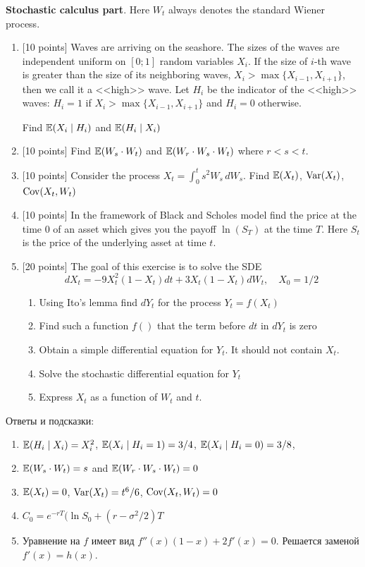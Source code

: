 \documentclass[pdftex,12pt,a4paper]{article}
\begin{document}
\vspace{20pt}

\textbf{Stochastic calculus part}. Here $W_t$ always denotes the standard Wiener process. 

\vspace{20pt}

\begin{enumerate}[resume]
\item $[$10 points] Waves are arriving on the seashore. The sizes of the waves are independent uniform on $[0;1]$ random variables $X_i$. If the size of $i$-th wave is greater than the size of its neighboring waves, $X_i>\max\{X_{i-1},X_{i+1}\}$, then we call it a <<high>> wave. Let $H_i$ be the indicator of the <<high>> waves: $H_i=1$ if $X_i>\max\{X_{i-1},X_{i+1}\}$ and $H_i=0$ otherwise.

Find $\mathbb{E}(X_i \mid H_i)$ and $\mathbb{E}(H_i \mid X_i)$ 
\item $[$10 points] Find $\mathbb{E}(W_s \cdot W_t)$ and $\mathbb{E}(W_r \cdot W_s \cdot W_t)$ where $r<s<t$.
\item $[$10 points] Consider the process $X_t=\int_0^t s^2 W_s\,dW_s$. Find $\mathbb{E}(X_t)$, $\operatorname{Var}(X_t)$, $\operatorname{Cov}(X_t,W_t)$
\item $[$10 points] In the framework of Black and Scholes model find the price at the time $0$ of an asset which gives you the payoff $\ln(S_T)$ at the time $T$. Here $S_t$ is the price of the underlying asset at time $t$.

\item $[$20 points] The goal of this exercise is to solve the SDE
\[
dX_t=-9X_t^2(1-X_t)dt+3X_t(1-X_t)dW_t,\quad X_0=1/2
\]
\begin{enumerate}
\item Using Ito's lemma find $dY_t$ for the process $Y_t=f(X_t)$ 
\item Find such a function $f()$ that the term before $dt$ in $dY_t$ is zero
\item Obtain a simple differential equation for $Y_t$. It should not contain $X_t$.
\item Solve the stochastic differential equation for $Y_t$
\item Express $X_t$ as a function of $W_t$ and $t$.
\end{enumerate}

\end{enumerate}

Ответы и подсказки:
\begin{enumerate}
\item $\mathbb{E}(H_i \mid X_i)=X_i^2$, $\mathbb{E}(X_i \mid H_i=1)=3/4$, $\mathbb{E}(X_i \mid H_i=0)=3/8$, 
\item $\mathbb{E}(W_s \cdot W_t)=s$ and $\mathbb{E}(W_r \cdot W_s \cdot W_t)=0$
\item $\mathbb{E}(X_t)=0$, $\operatorname{Var}(X_t)=t^6/6$, $\operatorname{Cov}(X_t,W_t)=0$
\item $C_0=e^{-rT}(\ln S_0+(r-\sigma^2/2)T$
\item Уравнение на $f$ имеет вид $f''(x)(1-x)+2f'(x)=0$. Решается заменой $f'(x)=h(x)$.
\end{enumerate}
\end{document}
